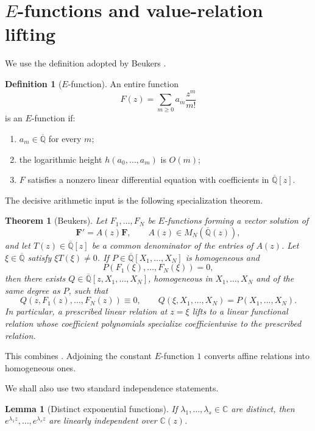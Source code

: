 \documentclass[11pt]{article}
\numberwithin{equation}{section}
\newtheorem{theorem}{Theorem}[section]
\newtheorem{lemma}[lemma]{Lemma}
\theoremstyle{definition}
\newtheorem{definition}[definition]{Definition}
\theoremstyle{remark}
\newcommand{\C}{\mathbb C}
\newcommand{\Qbar}{\overline{\mathbb Q}}
\begin{document}
\section{\texorpdfstring{$E$}{E}-functions and value-relation lifting}\label{sec:E-functions}

We use the definition adopted by Beukers \cite[Section~1]{Beukers}.

\begin{definition}[$E$-function]\label{def:E-function}
An entire function
\[
  F(z)=\sum_{m\ge0}a_m\frac{z^m}{m!}
\]
is an $E$-function if:
\begin{enumerate}[label=\textup{(\roman*)},leftmargin=2.2em]
\item $a_m\in\Qbar$ for every $m$;
\item the logarithmic height $h(a_0,\ldots,a_m)$ is $O(m)$;
\item $F$ satisfies a nonzero linear differential equation with coefficients
in $\Qbar[z]$.
\end{enumerate}
\end{definition}

The decisive arithmetic input is the following specialization theorem.

\begin{theorem}[Beukers]\label{thm:Beukers}
Let $F_1,\ldots,F_N$ be $E$-functions forming a vector solution of
\[
  \mathbf F'=A(z)\mathbf F,
  \qquad A(z)\in M_N(\Qbar(z)),
\]
and let $T(z)\in\Qbar[z]$ be a common denominator of the entries of $A(z)$.
Let $\xi\in\Qbar$ satisfy $\xi T(\xi)\ne0$.  If
$P\in\Qbar[X_1,\ldots,X_N]$ is homogeneous and
\[
  P(F_1(\xi),\ldots,F_N(\xi))=0,
\]
then there exists
$Q\in\Qbar[z,X_1,\ldots,X_N]$, homogeneous in $X_1,\ldots,X_N$ and of the
same degree as $P$, such that
\[
  Q(z,F_1(z),\ldots,F_N(z))\equiv0,
  \qquad
  Q(\xi,X_1,\ldots,X_N)=P(X_1,\ldots,X_N).
\]
In particular, a prescribed linear relation at $z=\xi$ lifts to a linear
functional relation whose coefficient polynomials specialize coefficientwise
to the prescribed relation.
\end{theorem}

This combines \cite[Theorems~1.3 and 3.2]{Beukers}.  Adjoining the constant
$E$-function $1$ converts affine relations into homogeneous ones.

We shall also use two standard independence statements.

\begin{lemma}[Distinct exponential functions]\label{lem:distinct-exponentials}
If $\lambda_1,\ldots,\lambda_s\in\C$ are distinct, then
$e^{\lambda_1z},\ldots,e^{\lambda_sz}$ are linearly independent over
$\C(z)$.
\end{lemma}
\end{document}

